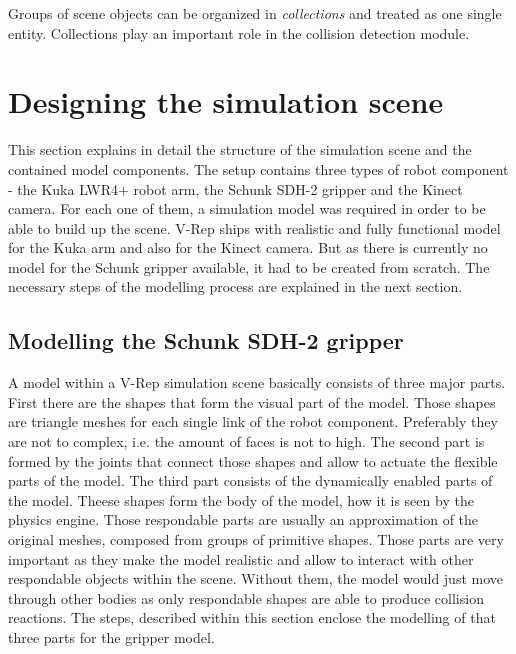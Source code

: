 Groups of scene objects can be organized in \emph{collections} and treated as one single entity. Collections play an important role in the collision detection module.


\section{Designing the simulation scene}
This section explains in detail the structure of the simulation scene and the contained model components. The setup contains three types of robot component - the Kuka LWR4+ robot arm, the Schunk SDH-2 gripper and the Kinect camera. For each one of them, a simulation model was required in order to be able to build up the scene. V-Rep ships with realistic and fully functional model for the Kuka arm and also for the Kinect camera. But as there is currently no model for the Schunk gripper available, it had to be created from scratch. The necessary steps of the modelling process are explained in the next section.

\subsection{Modelling the Schunk SDH-2 gripper}

A model within a V-Rep simulation scene basically consists of three major parts. First there are the shapes that form the visual part of the model. Those shapes are triangle meshes for each single link of the robot component. Preferably they are not to complex, i.e. the amount of faces is not to high. The second part is formed by the joints that connect those shapes and allow to actuate the flexible parts of the model. The third part consists of the dynamically enabled parts of the model. Theese shapes form the body of the model, how it is seen by the physics engine. Those respondable parts are usually an approximation of the original meshes, composed from groups of primitive shapes. Those parts are very important as they make the model realistic and allow to interact with other respondable objects within the scene. Without them, the model would just move through other bodies as only respondable shapes are able to produce collision reactions. The steps, described within this section enclose the modelling of that three parts for the gripper model.\\

